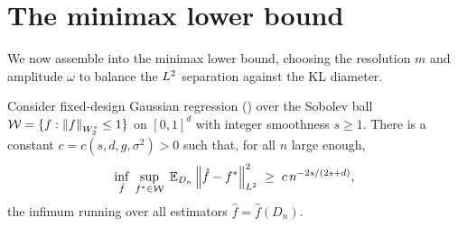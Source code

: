 \section{The minimax lower bound}\label{sec:main}

We now assemble  into the minimax lower
bound, choosing the resolution $m$ and amplitude $\omega$ to balance the
$L^{2}$ separation against the KL diameter.

\begin{theorem}\label{thm:main}
Consider fixed-design Gaussian regression () over the Sobolev
ball $\mathcal{W}=\{f:\left\| f \right\|_{W^{s}_{2}}\le1\}$ on $[0,1]^d$ with integer
smoothness $s\ge 1$. There is a constant $c=c(s,d,g,\sigma^2)>0$ such that, for
all $n$ large enough,
\begin{align}\label{eq:main}
\inf_{\hat f}\;\sup_{f^*\in\mathcal{W}}\;
\mathbb{E}_{D_n}\left\| \hat f-f^* \right\|_{L^{2}}^2
\;\ge\; c\,n^{-2s/(2s+d)},
\end{align}
the infimum running over all estimators $\hat f=\hat f(D_n)$.
\end{theorem}

